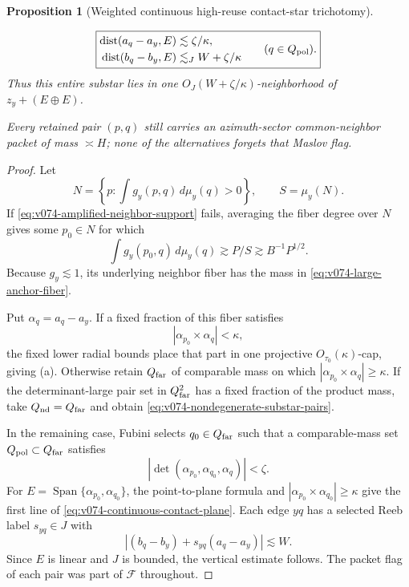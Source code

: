 \documentclass[10pt]{article}
\newtheorem{proposition}[theorem]{Proposition}
\newcommand{\Span}{\operatorname{Span}}
\begin{document}
\begin{proposition}[Weighted continuous high-reuse contact-star trichotomy]
\begin{enumerate}[label=\textnormal{(\roman*)}]
\begin{enumerate}[label=\textnormal{(\alph*)}]
\begin{equation}
    \label{eq:v074-continuous-contact-plane}
    \boxed{
    \begin{aligned}
    \operatorname{dist}(a_q-a_y,E)&\lesssim\zeta/\kappa,\\
    \operatorname{dist}(b_q-b_y,E)&\lesssim_J W+\zeta/\kappa
    \end{aligned}
    \qquad(q\in Q_{\rm pol}).
    }
    \end{equation}
    Thus this entire substar lies in one
    \(O_J(W+\zeta/\kappa)\)-neighborhood of
    \(z_y+(E\oplus E)\).
  \end{enumerate}
\end{enumerate}
Every retained pair \((p,q)\) still carries an azimuth-sector common-neighbor packet of mass
\(\asymp H\); none of the alternatives forgets that Maslov flag.
\end{proposition}

\begin{proof}
Let
\[
N=\left\{p:\int g_y(p,q)\,d\mu_y(q)>0\right\},
\qquad S=\mu_y(N).
\]
If \eqref{eq:v074-amplified-neighbor-support} fails, averaging the fiber degree over \(N\) gives
some \(p_0\in N\) for which
\[
\int g_y(p_0,q)\,d\mu_y(q)
\gtrsim P/S
\gtrsim B^{-1}P^{1/2}.
\]
Because \(g_y\lesssim1\), its underlying neighbor fiber has the mass in
\eqref{eq:v074-large-anchor-fiber}.

Put \(\alpha_q=a_q-a_y\).  If a fixed fraction of this fiber satisfies
\[
|\alpha_{p_0}\times\alpha_q|<\kappa,
\]
the fixed lower radial bounds place that part in one projective
\(O_{\tau_0}(\kappa)\)-cap, giving (a).  Otherwise retain
\(Q_{\rm far}\) of comparable mass on which
\(|\alpha_{p_0}\times\alpha_q|\ge\kappa\).
If the determinant-large pair set in \(Q_{\rm far}^2\) has a fixed fraction of the product mass,
take \(Q_{\rm nd}=Q_{\rm far}\) and obtain
\eqref{eq:v074-nondegenerate-substar-pairs}.

In the remaining case, Fubini selects \(q_0\in Q_{\rm far}\) such that a comparable-mass set
\(Q_{\rm pol}\subset Q_{\rm far}\) satisfies
\[
|\det(\alpha_{p_0},\alpha_{q_0},\alpha_q)|<\zeta.
\]
For \(E=\Span\{\alpha_{p_0},\alpha_{q_0}\}\), the point-to-plane formula and
\(|\alpha_{p_0}\times\alpha_{q_0}|\ge\kappa\) give the first line of
\eqref{eq:v074-continuous-contact-plane}.  Each edge \(yq\) has a selected Reeb label
\(s_{yq}\in J\) with
\[
|(b_q-b_y)+s_{yq}(a_q-a_y)|\lesssim W.
\]
Since \(E\) is linear and \(J\) is bounded, the vertical estimate follows.  The packet flag of
each pair was part of \(\mathscr F\) throughout.
\end{proof}
\end{document}
